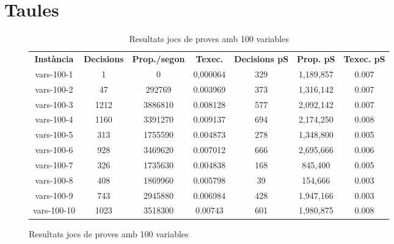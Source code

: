 \section{Taules}
\begin{figure}[H]
	\centering
	\begin{table}[H]
		\begin{tabular}{ccccccc}
			\rowcolor[HTML]{C0C0C0} 
			{\color[HTML]{000000} \textbf{Instància}} & {\color[HTML]{000000} \textbf{Decisions}} & {\color[HTML]{000000} \textbf{Prop./segon}} & {\color[HTML]{000000} \textbf{Texec.}} & {\color[HTML]{000000} \textbf{Decisions pS}}& {\color[HTML]{000000} \textbf{Prop. pS}}& {\color[HTML]{000000} \textbf{Texec. pS}} \\
			vars-100-1 & 1 & 0 & 0,000064 & 329 & 1,189,857 & 0.007 \\
			vars-100-2 & 47 & 292769 & 0.003969 & 373 & 1,316,142 & 0.007 \\
			vars-100-3 & 1212 & 3886810 & 0.008128 & 577 & 2,092,142 & 0.007 \\
			vars-100-4 & 1160 & 3391270 & 0.009137 & 694 & 2,174,250 & 0.008 \\
			vars-100-5 & 313 & 1755590 & 0.004873 & 278 & 1,348,800 & 0.005\\
			vars-100-6 & 928 & 3469620 & 0.007012 & 666 & 2,695,666 & 0.006\\
			vars-100-7 & 326 & 1735630 & 0.004838 & 168 & 845,400 & 0.005\\
			vars-100-8 & 408 & 1869960 & 0.005798 & 39 & 154,666 & 0.003\\
			vars-100-9 & 743 & 2945880 & 0.006984 & 428 & 1,947,166 & 0.003\\
			vars-100-10 & 1023 & 3518300 & 0.00743 & 601 & 1,980,875 & 0.008 \\                                         
		\end{tabular}
			\caption{Resultats jocs de proves amb 100 variables}
	\end{table}

	\label{fig:my_label}
\end{figure}

